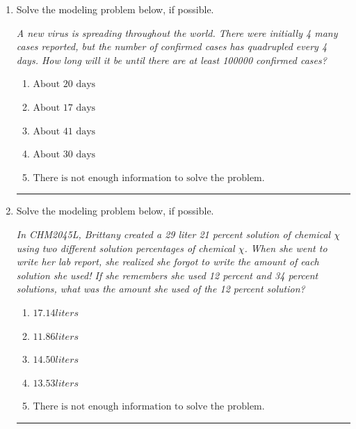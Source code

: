 \documentclass[14pt]{extbook}
\newcommand{\litem}[1]{\item#1\hspace*{-1cm}\rule{\textwidth}{0.4pt}}
\begin{document}
\begin{enumerate}
{\begin{enumerate}[label=\Alph*.]
\end{enumerate} }
\litem{
Solve the modeling problem below, if possible.
\begin{center}
    \textit{ A new virus is spreading throughout the world. There were initially 4 many cases reported, but the number of confirmed cases has quadrupled every 4 days. How long will it be until there are at least 100000 confirmed cases? }
\end{center}
\begin{enumerate}[label=\Alph*.]
\item \( \text{About } 20 \text{ days} \)
\item \( \text{About } 17 \text{ days} \)
\item \( \text{About } 41 \text{ days} \)
\item \( \text{About } 30 \text{ days} \)
\item \( \text{There is not enough information to solve the problem.} \)

\end{enumerate} }
\litem{
Solve the modeling problem below, if possible.
\begin{center}
    \textit{ In CHM2045L, Brittany created a 29 liter 21 percent solution of chemical $\chi$ using two different solution percentages of chemical $\chi$. When she went to write her lab report, she realized she forgot to write the amount of each solution she used! If she remembers she used 12 percent and 34 percent solutions, what was the amount she used of the 12 percent solution? }
\end{center}
\begin{enumerate}[label=\Alph*.]
\item \( 17.14 liters \)
\item \( 11.86 liters \)
\item \( 14.50 liters \)
\item \( 13.53 liters \)
\item \( \text{There is not enough information to solve the problem.} \)


\end{enumerate}}
\end{enumerate}
\end{document}
